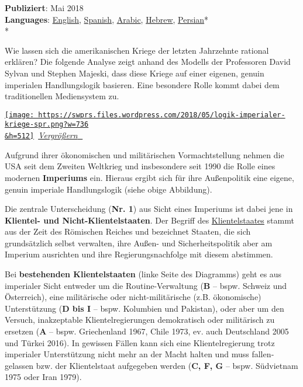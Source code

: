 \textbf{Publiziert}: Mai 2018\\
\textbf{Languages}:
\href{https://swprs.org/us-foreign-policy/}{English},
\href{https://swprs.files.wordpress.com/2019/12/logic-of-us-foreign-policy-spanish.pdf}{Spanish},
\href{https://swprs.org/the-logic-of-us-foreign-policy-arabic/}{Arabic},
\href{https://swprs.org/us-foreign-policy-hebrew/}{Hebrew},
\href{https://swprs.files.wordpress.com/2019/12/logic-of-us-foreign-policy-persian.pdf}{Persian}*\\
*

Wie lassen sich die amerikanischen Kriege der letzten Jahrzehnte
rational erklären? Die folgende Analyse zeigt anhand des Modells der
Professoren David Sylvan und Stephen Majeski, dass diese Kriege auf
einer eigenen, genuin imperialen Handlungslogik basieren. Eine besondere
Rolle kommt dabei dem traditionellen Mediensystem zu.

\href{https://swprs.files.wordpress.com/2018/05/logik-imperialer-kriege-spr.png}{\texttt{[image: https://swprs.files.wordpress.com/2018/05/logik-imperialer-kriege-spr.png?w=736\\\&h=512]}}~\href{https://swprs.files.wordpress.com/2018/05/logik-imperialer-kriege-spr.png}{\emph{Vergrößern}
🔎}

Aufgrund ihrer ökonomischen und militärischen Vormachtstellung nehmen
die USA seit dem Zweiten Weltkrieg und insbesondere seit 1990 die Rolle
eines modernen \textbf{Imperiums} ein. Hieraus ergibt sich für ihre
Außenpolitik eine eigene, genuin imperiale Handlungslogik (siehe obige
Abbildung).

Die zentrale Unterscheidung (\textbf{Nr. 1}) aus Sicht eines Imperiums
ist dabei jene in \textbf{Klientel- und Nicht-Klientelstaaten}. Der
Begriff des
\href{https://en.wikipedia.org/wiki/Client_state}{Klientelstaates}
stammt aus der Zeit des Römischen Reiches und bezeichnet Staaten, die
sich grundsätzlich selbst verwalten, ihre Außen- und Sicherheitspolitik
aber am Imperium ausrichten und ihre Regierungsnachfolge mit diesem
abstimmen.

Bei \textbf{bestehenden Klientelstaaten} (linke Seite des Diagramms)
geht es aus imperialer Sicht entweder um die Routine-Verwaltung
(\textbf{B} -- bspw. Schweiz und Österreich), eine militärische oder
nicht-militärische (z.B. ökonomische) Unterstützung (\textbf{D bis I} --
bspw. Kolumbien und Pakistan), oder aber um den Versuch, inakzeptable
Klientelregierungen demokratisch oder militärisch zu ersetzen
(\textbf{A} -- bspw. Griechenland 1967, Chile 1973, ev. auch Deutschland
2005 und Türkei 2016). In gewissen Fällen kann sich eine
Klientelregierung trotz imperialer Unterstützung nicht mehr an der Macht
halten und muss fallen­gelassen bzw. der Klientelstaat aufgegeben werden
(\textbf{C, F, G} -- bspw. Südvietnam 1975 oder Iran 1979).

